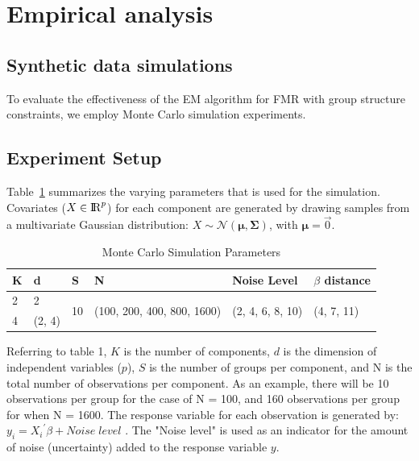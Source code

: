 \documentclass[12pt]{article}
\begin{document}
\section{Empirical analysis}
\subsection{Synthetic data simulations}
To evaluate the effectiveness of the EM algorithm for FMR with group structure constraints, we employ Monte Carlo simulation experiments.
\subsection{Experiment Setup}
Table~\ref{tab:exp} summarizes the varying parameters that is used for the simulation.
Covariates ($X \in {\rm I\!R}^p$) for each component are generated by drawing samples from a multivariate Gaussian distribution:  $X \sim  \mathcal{N}(\boldsymbol{{\mu}} , \boldsymbol{{\Sigma}})$, with $\boldsymbol{\mu}=\overrightarrow{0}$.
\begin{table}[!htbp]
\centering
\caption{Monte Carlo Simulation Parameters}\label{tab:exp}
\begin{tabular}{|l|l|l|l|l|l|}
\hline
K & d      & S                   & N                                           & Noise Level                       & $\beta$ distance               \\ \hline
2 & 2      & \multirow{2}{*}{10} & \multirow{2}{*}{(100, 200, 400, 800, 1600)} & \multirow{2}{*}{(2, 4, 6, 8, 10)} & \multirow{2}{*}{(4, 7, 11)} \\ \cline{1-2}
4 & (2, 4) &                     &                                             &                                   &                             \\ \hline
\end{tabular}
\end{table}

Referring to table 1, $K$ is the number of components, $d$ is the dimension of independent variables ($p$), $S$ is the number of groups per component, and N is the total number of observations per component. As an example, there will be 10 observations per group for the case of N = 100, and 160 observations per group for when N = 1600. The response variable for each observation is generated by: $y_i= {X_i}^{'}\beta+Noise\; level$ . The "Noise level" is used as an indicator for the amount of noise (uncertainty) added to the response variable $y$.
\end{document}
